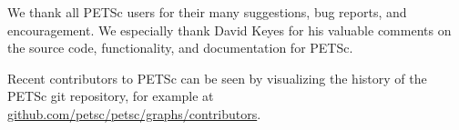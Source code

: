 %
%

\medskip \medskip \noindent
We thank all PETSc users for their many suggestions, bug reports, and
encouragement.  We especially thank David Keyes
for his valuable comments on the source code,
functionality, and documentation for PETSc.

\vspace{.2in}

\noindent
Recent contributors to PETSc can be seen by visualizing the history of the PETSc git repository, for example at
\href{https://github.com/petsc/petsc/graphs/contributors}{github.com/petsc/petsc/graphs/contributors}.

\vspace{.2in}

